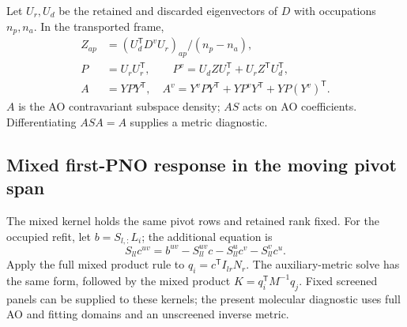 \documentclass[11pt]{article}
\begin{document}
Let $U_r,U_d$ be the retained and discarded eigenvectors of $D$ with
occupations $n_p,n_a$. In the transported frame,
\begin{align}
 Z_{ap}&=(U_d^{\mathsf T}D^vU_r)_{ap}/(n_p-n_a),\\
 P&=U_r U_r^{\mathsf T},\qquad P^v=U_d Z U_r^{\mathsf T}+U_r Z^{\mathsf T}U_d^{\mathsf T},\\
 A&=YPY^{\mathsf T},\quad
 A^v=Y^v P Y^{\mathsf T}+YP^vY^{\mathsf T}+YP(Y^v)^{\mathsf T}.
\end{align}
$A$ is the AO contravariant subspace density; $AS$ acts on AO coefficients.
Differentiating $ASA=A$ supplies a metric diagnostic.

\subsection{Mixed first-PNO response in the moving pivot span}
The mixed kernel holds the same pivot rows and retained rank fixed. For
the occupied refit, let $b=S_{l,:}L_i$; the additional equation is
\begin{equation}
 S_{ll}c^{uv}=b^{uv}-S_{ll}^{uv}c-S_{ll}^{u}c^v-S_{ll}^{v}c^u.
\end{equation}
Apply the full mixed product rule to $q_i=c^{\mathsf T}I_{lr}N_r$.
The auxiliary-metric solve has the same form, followed by the mixed
product $K=q_i^{\mathsf T}M^{-1}q_j$. Fixed screened panels can be
supplied to these kernels; the present molecular diagnostic uses full
AO and fitting domains and an unscreened inverse metric.
\end{document}
